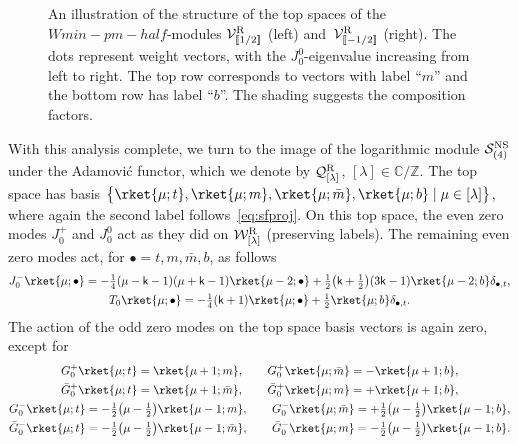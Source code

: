 \documentclass[10pt,a4paper]{amsart}
\numberwithin{equation}{section}
\newcommand{\bG}{\bar{G}{}}
\newcommand{\bm}{\bar{m}}
\newcommand{\kk}{\mathsf{k}} %
\newcommand{\NS}{\textnormal{NS}}
\newcommand{\R}{\textnormal{R}}
\DeclarePairedDelimiter{\dbrac}{\llbracket}{\rrbracket} %
\newcommand{\fld}[1]{\mathbb{#1}} %
\newcommand{\VOA}[1]{\mathsf{#1}} %
\newcommand{\Mod}[1]{\mathcal{#1}} %
\newcommand{\ZZ}{\fld{Z}}
\newcommand{\CC}{\fld{C}}
\newcommand{\swalg}[2]{\VOA{W}_{#1}^{\mathrm{#2}}} %
\newcommand{\smin}[1][\kk]{\swalg{#1}{min}} %
\newcommand{\sminpmhalf}{\smin[\pm 1/2]}
\newcommand{\sfnsmod}{\Mod{S}^{\NS}} %
\newcommand{\nrverma}[1]{\Mod{W}^{\R}_{[#1]}}
\newcommand{\nrver}[1]{\Mod{V}^{\R}_{\vphantom{[#1]}\smash{\dbrac{#1}}}}
\newcommand{\nrlog}[1]{\Mod{Q}^{\R}_{[#1]}}
\def\smash#1{#1}
\def\sminpmhalf{Wmin-pm-half}
\begin{document}
\begin{figure}
\caption{%
	An illustration of the structure of the top spaces of the \smash{$\sminpmhalf$}-modules $\nrver{1/2}$ (left) and~$\nrver{-1/2}$ (right).
	The dots represent weight vectors, with the $J^0_0$-eigenvalue increasing from left to right.
	The top row corresponds to vectors with label ``$m$'' and the bottom row has label ``$b$''.
	The shading suggests the composition factors.
} \label{fig:Vpm1/2}
\end{figure}

With this analysis complete, we turn to the image of the logarithmic module \smash{$\sfnsmod_{(4)}$} under the Adamovi{\'c} functor, which we denote by \smash{$\nrlog{\lambda}$}, $[\lambda] \in \CC/\ZZ$.
The top space has basis $\bigl\{ \rket{\mu;t}, \rket{\mu;m}, \rket{\mu;\bm}, \rket{\mu;b} \mid \mu \in [\lambda] \bigr\}$, where again the second label follows~\eqref{eq:sfproj}.
On this top space, the even zero modes $J^{+}_{0}$ and $J^{0}_{0}$ act as they did on $\nrverma{\lambda}$ (preserving labels).
The remaining even zero modes act, for $\bullet = t,m,\bm,b$, as follows
\begin{gather}
		J^{-}_{0} \rket{\mu;\bullet} = -\tfrac{1}{4}(\mu-\kk-1)(\mu+\kk-1) \rket{\mu-2;\bullet} + \tfrac{1}{2}\bigl(\kk+\tfrac{1}{2}\bigr)(3\kk-1) \rket{\mu-2;b} \delta_{\bullet,t}, \nonumber\\
		T_0 \rket{\mu;\bullet} = -\tfrac{1}{4}(\kk+1)\rket{\mu;\bullet} + \tfrac{1}{2} \rket{\mu;b} \delta_{\bullet,t}.\label{eq:sl2action''}
\end{gather}
The action of the odd zero modes on the top space basis vectors is again zero, except for
\begin{gather*} %
 G^{+}_{0} \rket{\mu;t} = \rket{\mu+1;m}, \qquad G^{+}_{0} \rket{\mu;\bm} = -\rket{\mu+1;b}, \\
 \bG^{+}_{0} \rket{\mu;t} = \rket{\mu+1;\bm}, \qquad \bG^{+}_{0} \rket{\mu;m} = +\rket{\mu+1;b}, \\
 G^{-}_{0} \rket{\mu;t} = -\tfrac{1}{2}\bigl(\mu-\tfrac{1}{2}\bigr) \rket{\mu-1;m},\qquad
 G^{-}_{0} \rket{\mu;\bm} = +\tfrac{1}{2}\bigl(\mu-\tfrac{1}{2}\bigr) \rket{\mu-1;b}, \\
 \bG^{-}_{0} \rket{\mu;t} = -\tfrac{1}{2}\bigl(\mu-\tfrac{1}{2}\bigr) \rket{\mu-1;\bm},\qquad
 \bG^{-}_{0} \rket{\mu;m} = -\tfrac{1}{2}\bigl(\mu-\tfrac{1}{2}\bigr) \rket{\mu-1;b}.
\end{gather*}
\end{document}
